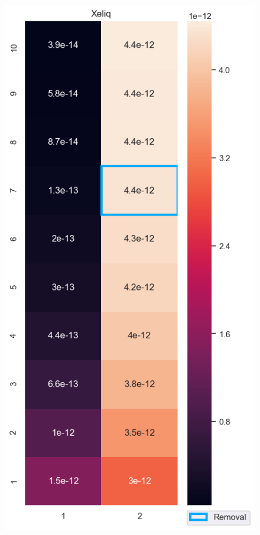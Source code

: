 \begin{figure}[ht] 
\centering
\begin{minipage}{.5\textwidth}
  \centering
  \includegraphics[width=1\linewidth]{images/XeliqHeatMap.png}

\end{minipage}
\end{figure}
